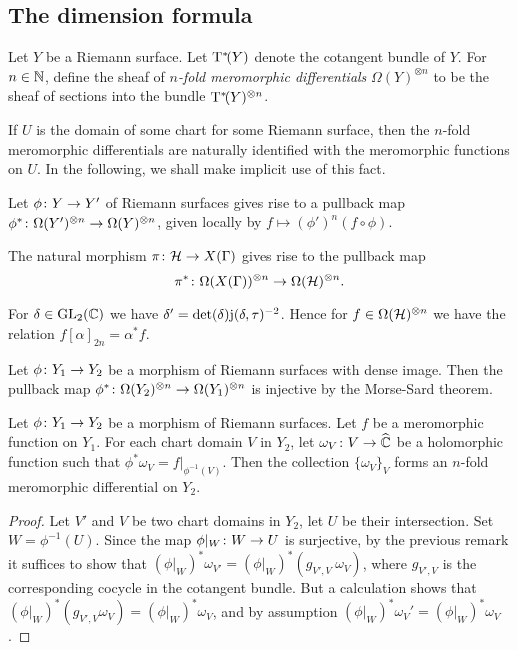 \subsection{The dimension formula}

\begin{defi}
 Let $Y$ be a Riemann surface. Let $\mathrm{T}^*\!(Y)$ denote the cotangent bundle of $Y$. For $n\in\mathbb{N}$, define the sheaf of \emph{$n$-fold meromorphic differentials} $\Omega(Y)^{\otimes n}$ to be the sheaf of sections into the bundle $\mathrm{T}^*\!(Y)^{\otimes n}$.
\end{defi}

If $U$ is the domain of some chart for some Riemann surface, then the $n$-fold meromorphic differentials are naturally identified with the meromorphic functions on $U$. In the following, we shall make implicit use of this fact.

\begin{defi} Let $\phi\colon Y\to Y'$ of Riemann surfaces gives rise to a pullback map $\phi^*\colon\Omega(Y')^{\otimes n}\to\Omega(Y)^{\otimes n}$, given locally by $f\mapsto (\phi')^n (f\circ\phi)$.
\end{defi}

\begin{expl}
The natural morphism $\pi\colon\mathcal{H}\to X(\Gamma)$ gives rise to the pullback map \[\pi^*\colon\Omega(X(\Gamma))^{\otimes n}\to\Omega(\mathcal{H})^{\otimes n}.\]

For $\delta\in\operatorname{GL}_2(\mathbb{C})$ we have $\delta'=\det(\delta)\mathrm{j}(\delta,\tau)^{-2}$. Hence for $f\in\Omega(\mathcal{H})^{\otimes n}$ we have the relation $f[\alpha]_{2n} = \alpha^* f$.
\end{expl}
\begin{rmk} \label{pr:morse-sard}
 Let $\phi\colon Y_1\to Y_2$ be a morphism of Riemann surfaces with dense image. Then the pullback map $\phi^*\colon\Omega(Y_2)^{\otimes n}\to\Omega(Y_1)^{\otimes n}$ is injective by the Morse-Sard theorem.
\end{rmk}

\begin{prop} \label{pr:gluing-differentials}
 Let $\phi\colon Y_1\to Y_2$ be a morphism of Riemann surfaces. Let $f$ be a meromorphic function on $Y_1$. For each chart domain $V$ in $Y_2$, let  $\omega_V\colon V\to \widehat{\mathbb{C}}$ be a holomorphic function such that $\phi^*\omega_V=f|_{\phi^{-1}(V)}$. Then the collection $\{\omega_V\}_V$ forms an $n$-fold meromorphic differential on $Y_2$.
\end{prop}

\begin{proof}
 Let $V'$ and $V$ be two chart domains in $Y_2$, let $U$ be their intersection. Set $W=\phi^{-1}(U)$. Since the map $\phi|_W\colon W\to U$ is surjective, by the previous remark it suffices to show that $(\phi|_W)^*\omega_{V'}=(\phi|_W)^*(g_{V',V}\ \omega_V)$, where $g_{V',V}$ is the corresponding cocycle in the cotangent bundle. But a calculation shows that $(\phi|_W)^*(g_{V',V}\omega_V)=(\phi|_W)^* \omega_V$, and by assumption $(\phi|_W)^* \omega_V' = (\phi|_W)^* \omega_V$.
\end{proof}

